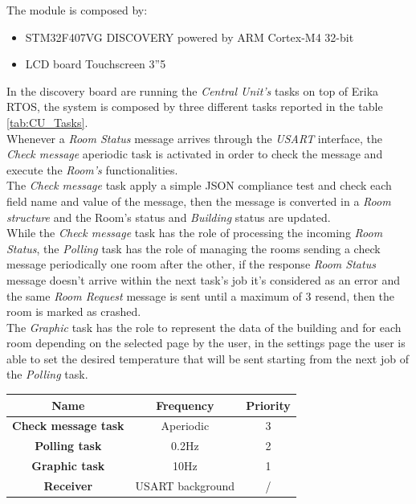 The module is composed by:
\begin{itemize}
	\item STM32F407VG DISCOVERY powered by ARM Cortex-M4 32-bit
	\item LCD board Touchscreen 3”5
\end{itemize}
In the discovery board are running the \textit{Central Unit's} tasks on top of Erika RTOS, the system is composed by three different tasks reported in the table \ref{tab:CU_Tasks}.\\
Whenever a \textit{Room Status} message arrives through the \textit{USART} interface, the \textit{Check message} aperiodic task is activated in order to check the message and execute the \textit{Room's} functionalities.\\
The \textit{Check  message} task apply a simple JSON compliance test and check each field name and value of the message, then the message is converted in a \textit{Room structure} and the Room's status and \textit{Building} status are updated.\\
While the \textit{Check message} task has the role of processing the incoming \textit{Room Status}, the \textit{Polling} task has the role of managing the rooms sending a check message periodically one room after the other, 
if the response \textit{Room Status} message doesn't arrive within the next task's job it's considered as an error and the same \textit{Room Request} message is sent until a maximum of 3 resend, then the room is marked as crashed.\\
The \textit{Graphic} task has the role to represent the data of the building and for each room depending on the selected page by the user, in the settings page the user is able to set the desired temperature that will be sent starting from the next job of the \textit{Polling} task.\\
\begin{center}
	\begin{tabular}{||c | c | c ||} 
		\hline
		Name 	& Frequency & Priority	\\ 
		\hline
		\textbf{Check message task}	&	Aperiodic		& 3 	\\ 
		\hline
		\textbf{Polling task}		&	0.2Hz			& 2 	\\ 
		\hline
		\textbf{Graphic task}		&	10Hz			& 1 	\\ 
		\hline
		\textbf{Receiver}			&	USART background		& / 	\\ 
		\hline
	\end{tabular}
\end{center}
